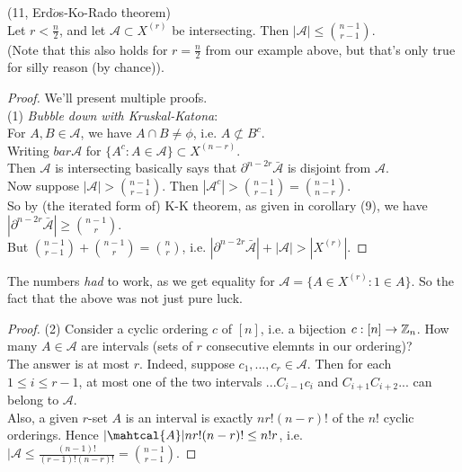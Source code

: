 \documentclass[a4paper]{article}
\begin{document}
\begin{thm} (11, Erd$\ddot{o}$s-Ko-Rado theorem)\\
    Let $r < \frac{n}{2}$, and let $\mathcal{A} \subset X^{(r)}$ be intersecting. Then $|\mathcal{A}| \leq {{n-1} \choose {r-1}}$.\\
    (Note that this also holds for $r = \frac{n}{2}$ from our example above, but that's only true for silly reason (by chance)).
    \begin{proof}
        We'll present multiple proofs.\\
        (1) \emph{Bubble down with Kruskal-Katona}:\\
        For $A,B \in \mathcal{A}$, we have $A \cap B \neq \phi$, i.e. $A \not\subset B^c$.\\
        Writing $bar{\mathcal{A}}$ for $\{A^c:A \in \mathcal{A}\} \subset X^{(n-r)}$.\\
        Then $\mathcal{A}$ is intersecting basically says that $\partial^{n-2r} \bar{\mathcal{A}}$ is disjoint from $\mathcal{A}$.\\
        Now suppose $|\mathcal{A}| > {{n-1} \choose {r-1}}$. Then $|\mathcal{A}^c| > {{n-1} \choose {r-1}} = {{n-1} \choose {n-r}}$.\\
        So by (the iterated form of) K-K theorem, as given in corollary (9), we have $|\partial^{n-2r} \bar{\mathcal{A}}| \geq {{n-1} \choose r}$.\\
        But ${{n-1} \choose {r-1}} + {{n-1} \choose r} = {n \choose r}$, i.e. $|\partial^{n-2r} \bar{\mathcal{A}}| + |\mathcal{A}| > |X^{(r)}|$.
    \end{proof}

    \begin{rem}
        The numbers \emph{had} to work, as we get equality for $\mathcal{A} = \{A \in X^{(r)} : 1 \in A\}$. So the fact that the above was not just pure luck.
    \end{rem}

    \begin{proof}
        (2) Consider a cyclic ordering $c$ of $[n]$, i.e. a bijection $c:[n] \to \mathbb{Z}_n$. How many $A \in \mathcal{A}$ are intervals (sets of $r$ consecutive elemnts in our ordering)?\\
        The answer is at most $r$. Indeed, suppose $c_1,...,c_r \in \mathcal{A}$. Then for each $1 \leq i \leq r-1$, at most one of the two intervals $...C_{i-1}{c_i}$ and $C_{i+1}C_{i+2}...$ can belong to $\mathcal{A}$.\\
        Also, a given $r$-set $A$ is an interval is exactly $n r! (n-r)!$ of the $n!$ cyclic orderings. Hence $|\mahtcal{A}| n r! (n-r)! \leq n! r$, i.e. $|\mathcal{A} \leq \frac{(n-1)!}{(r-1)!(n-r)!} = {{n-1} \choose {r-1}}$.
    \end{proof}


\end{thm}
\end{document}
